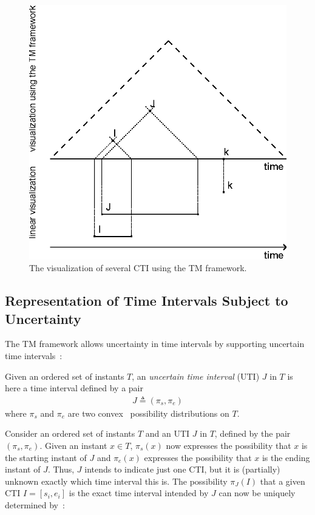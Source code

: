 \begin{figure}[h]
	\centering
	\includegraphics[width=0.9\columnwidth]{graphs/TM_model_several.eps}
	\caption{The visualization of several CTI using the TM framework.}
	\label{fig:tm-const-ex}
\end{figure}

\subsection{\label{subsec:tm-interval}Representation of Time Intervals Subject to Uncertainty}
The TM framework allows uncertainty in time intervals by supporting uncertain time intervals~\cite{DeTre2012}:

\begin{definition}
Given an ordered set of instants $T$, an \emph{uncertain time interval} (UTI) $J$ in $T$ is here a time interval defined by a pair
\begin{align}
J \triangleq (\pi_s, \pi_e) \nonumber
\end{align}
where $\pi_s$ and $\pi_e$ are two convex~\cite{Dubois1983} possibility distributions on $T$.
\end{definition}

Consider an ordered set of instants $T$ and an UTI $J$ in $T$, defined by the pair $(\pi_s, \pi_e)$. Given an instant $x \in T$, $\pi_s(x)$ now expresses the possibility that $x$ is the starting instant of $J$ and $\pi_e(x)$ expresses the possibility that $x$ is the ending instant of $J$. Thus, $J$ intends to indicate just one CTI, but it is (partially) unknown exactly which time interval this is. The possibility $\pi_J(I)$ that a given CTI $I = \left[s_i, e_i\right]$ is the exact time interval intended by $J$ can now be uniquely determined by~\cite{DeTre2012}:

